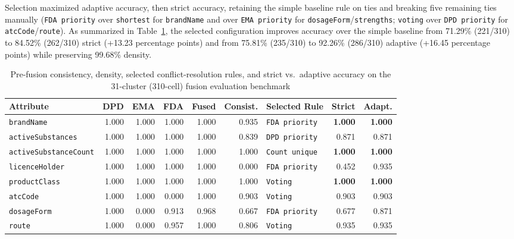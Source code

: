 \documentclass{llncs}
\begin{document}
Selection maximized adaptive accuracy, then strict accuracy, retaining the simple baseline rule on ties and breaking five remaining ties manually (\texttt{FDA priority} over \texttt{shortest} for \texttt{brandName} and over \texttt{EMA priority} for \texttt{dosageForm}/\texttt{strengths}; \texttt{voting} over \texttt{DPD priority} for \texttt{atcCode}/\texttt{route}). As summarized in Table~\ref{tab:fusion_results}, the selected configuration improves accuracy over the simple baseline from 71.29\% (221/310) to 84.52\% (262/310) strict (+13.23 percentage points) and from 75.81\% (235/310) to 92.26\% (286/310) adaptive (+16.45 percentage points) while preserving 99.68\% density.

\begin{table}[htbp]
\centering
\caption{Pre-fusion consistency, density, selected conflict-resolution rules, and strict vs.\ adaptive accuracy on the 31-cluster (310-cell) fusion evaluation benchmark}
\label{tab:fusion_results}
\scriptsize
\setlength{\tabcolsep}{2.2pt}
\begin{tabularx}{\textwidth}{|>{\raggedright\arraybackslash}X|r|r|r|r|r|l|r|r|}
\hline
\textbf{Attribute} & \textbf{DPD} & \textbf{EMA} & \textbf{FDA} & \textbf{Fused} & \textbf{Consist.} & \textbf{Selected Rule} & \textbf{Strict} & \textbf{Adapt.} \\
\hline
\texttt{brandName}            & 1.000 & 1.000 & 1.000 & 1.000 & 0.935 & \texttt{FDA priority} & \textbf{1.000} & \textbf{1.000} \\
\texttt{activeSubstances}     & 1.000 & 1.000 & 1.000 & 1.000 & 0.839 & \texttt{DPD priority} & 0.871 & 0.871 \\
\texttt{activeSubstanceCount} & 1.000 & 1.000 & 1.000 & 1.000 & 1.000 & \texttt{Count unique} & \textbf{1.000} & \textbf{1.000} \\
\texttt{licenceHolder}        & 1.000 & 1.000 & 1.000 & 1.000 & 0.000 & \texttt{FDA priority} & 0.452 & 0.935 \\
\texttt{productClass}         & 1.000 & 1.000 & 1.000 & 1.000 & 1.000 & \texttt{Voting}       & \textbf{1.000} & \textbf{1.000} \\
\texttt{atcCode}              & 1.000 & 1.000 & 0.000 & 1.000 & 0.903 & \texttt{Voting}       & 0.903 & 0.903 \\
\texttt{dosageForm}           & 1.000 & 0.000 & 0.913 & 0.968 & 0.667 & \texttt{FDA priority} & 0.677 & 0.871 \\
\texttt{route}                & 1.000 & 0.000 & 0.957 & 1.000 & 0.806 & \texttt{Voting}       & 0.935 & 0.935 \\

\end{tabularx}
\end{table}
\end{document}
